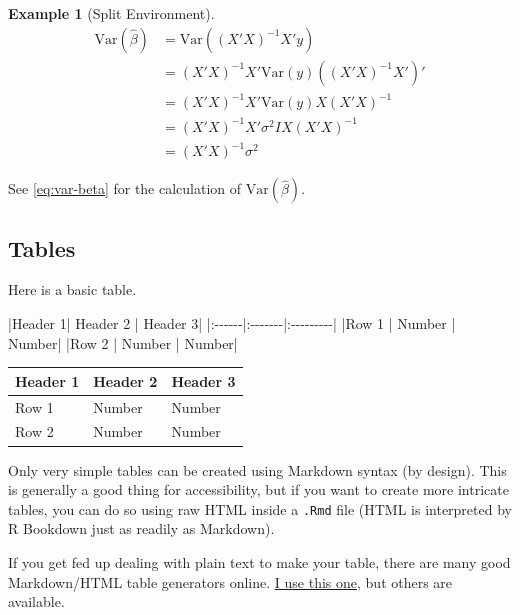 \documentclass[
]{article}
\newenvironment{Shaded}{\begin{snugshade}}{\end{snugshade}}
\newcommand{\NormalTok}[1]{#1}
\numberwithin{equation}{section}
\numberwithin{figure}{section}
\theoremstyle{break}
\theoremstyle{definition}
\theoremstyle{definition}
\newtheorem{example}{Example}[section]
\theoremstyle{definition}
\theoremstyle{definition}
\theoremstyle{remark}
\begin{document}
\begin{example}[Split Environment]
\begin{equation} 
\begin{split}
\mathrm{Var}(\hat{\beta}) & =\mathrm{Var}((X'X)^{-1}X'y)\\
 & =(X'X)^{-1}X'\mathrm{Var}(y)((X'X)^{-1}X')'\\
 & =(X'X)^{-1}X'\mathrm{Var}(y)X(X'X)^{-1}\\
 & =(X'X)^{-1}X'\sigma^{2}IX(X'X)^{-1}\\
 & =(X'X)^{-1}\sigma^{2}
\end{split}
\label{eq:var-beta}
\end{equation}

See \eqref{eq:var-beta} for the calculation of \(\mathrm{Var}(\hat{\beta})\).

\end{example}

\hypertarget{tables}{%
\subsection{Tables}\label{tables}}

Here is a basic table.

\begin{Shaded}
\begin{Highlighting}[]
\NormalTok{|Header 1| Header 2 | Header 3|}
\NormalTok{|:{-}{-}{-}{-}{-}{-}|:{-}{-}{-}{-}{-}{-}{-}|:{-}{-}{-}{-}{-}{-}{-}{-}{-}|}
\NormalTok{|Row 1 | Number | Number|}
\NormalTok{|Row 2 | Number | Number|}
\end{Highlighting}
\end{Shaded}

\begin{longtable}[]{@{}lll@{}}
\toprule\noalign{}
Header 1 & Header 2 & Header 3 \\
\midrule\noalign{}
\endhead
\bottomrule\noalign{}
\endlastfoot
Row 1 & Number & Number \\
Row 2 & Number & Number \\
\end{longtable}

Only very simple tables can be created using Markdown syntax (by design). This is generally a good thing for accessibility, but if you want to create more intricate tables, you can do so using raw HTML inside a \texttt{.Rmd} file (HTML is interpreted by R Bookdown just as readily as Markdown).

If you get fed up dealing with plain text to make your table, there are many good Markdown/HTML table generators online. \href{https://www.tablesgenerator.com/html_tables?target=_blank}{I use this one}, but others are available.
\end{document}
